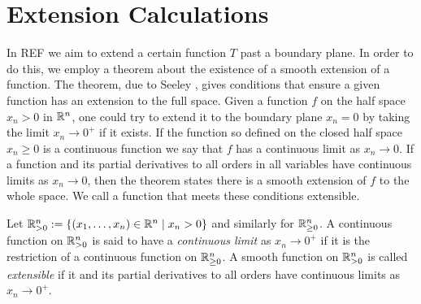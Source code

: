 
\section{Extension Calculations}
\label{sec:Extension Calculations}

In REF  we aim to extend a certain function $T$ past a boundary plane. In order to do this, we employ a theorem about the existence of a smooth extension of a function. The theorem, due to Seeley \cite{Seeley1964}, gives conditions that ensure a given function has an extension to the full space. Given a function $f$ on the half space $x_n > 0$ in $\mathbb{R}^n$, one could try to extend it to the boundary plane $x_n = 0$ by taking the limit $x_n \to 0^+$ if it exists. If the function so defined on the closed half space $x_n \geq 0$ is a continuous function we say that $f$ has a continuous limit as $x_n \to 0$. If a function and its partial derivatives to all orders in all variables have continuous limits as $x_n \to 0$, then the theorem states there is a smooth extension of $f$ to the whole space. We call a function that meets these conditions extensible.

\begin{defn}
Let $\mathbb{R}^n_{>0} := \{ (x_1, \dots, x_n) \in \mathbb{R}^n \mid x_n > 0\}$ and similarly for $\mathbb{R}^n_{\geq 0}$. A continuous function on $\mathbb{R}^n_{>0}$ is said to have a \emph{continuous limit} as $x_n \to 0^+$ if it is the restriction of a continuous function on $\mathbb{R}^n_{\geq 0}$. A smooth function on $\mathbb{R}^n_{>0}$ is called \emph{extensible} if it and its partial derivatives to all orders have continuous limits as $x_n \to 0^+$.
\end{defn}


